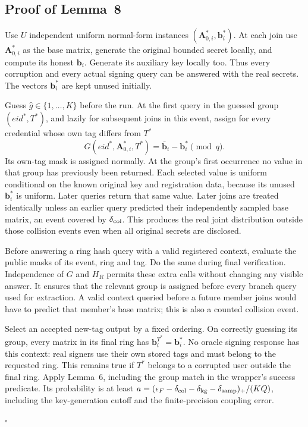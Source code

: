 \documentclass[lettersize,journal]{IEEEtran}
\newenvironment{proof}{{\noindent\it Proof:} }{\hfill $\square$\par}
\begin{document}
\subsection{Proof of Lemma~8}
\label{app:proof-new-tag}
\begin{proof}
	Use $U$ independent uniform normal-form instances $(\mathbf A_{0,i}^*,\mathbf b_i^*)$. At each join use $\mathbf A_{0,i}^*$ as the base matrix, generate the original bounded secret locally, and compute its honest $\mathbf b_i$. Generate its auxiliary key locally too. Thus every corruption and every actual signing query can be answered with the real secrets. The vectors $\mathbf b_i^*$ are kept unused initially.
	
	Guess $\widehat g\in\{1,\ldots,K\}$ before the run. At the first query in the guessed group $(eid^*,T^*)$, and lazily for subsequent joins in this event, assign for every credential whose own tag differs from $T^*$
	\[
	G(eid^*,\mathbf A_{0,i}^*,T^*)
	=\bar{\mathbf b}_i-\mathbf b_i^*\pmod q.
	\]
	Its own-tag mask is assigned normally. At the group's first occurrence no value in that group has previously been returned. Each selected value is uniform conditional on the known original key and registration data, because its unused $\mathbf b_i^*$ is uniform. Later queries return that same value. Later joins are treated identically unless an earlier query predicted their independently sampled base matrix, an event covered by $\delta_{\rm col}$. This produces the real joint distribution outside those collision events even when all original secrets are disclosed.
	
	Before answering a ring hash query with a valid registered context, evaluate the public masks of its event, ring and tag. Do the same during final verification. Independence of $G$ and $H_R$ permits these extra calls without changing any visible answer. It ensures that the relevant group is assigned before every branch query used for extraction. A valid context queried before a future member joins would have to predict that member's base matrix; this is also a counted collision event.
	
	Select an accepted new-tag output by a fixed ordering. On correctly guessing its group, every matrix in its final ring has $\mathbf b_i^{T^*}=\mathbf b_i^*$. No oracle signing response has this context: real signers use their own stored tags and must belong to the requested ring. This remains true if $T^*$ belongs to a corrupted user outside the final ring. Apply Lemma~6, including the group match in the wrapper's success predicate. Its probability is at least $a=(\epsilon_F-\delta_{\rm col}-\delta_{\rm kg}-\delta_{\rm samp})_+/(KQ)$, including the key-generation cutoff and the finite-precision coupling error.
	

\end{proof}
\end{document}

